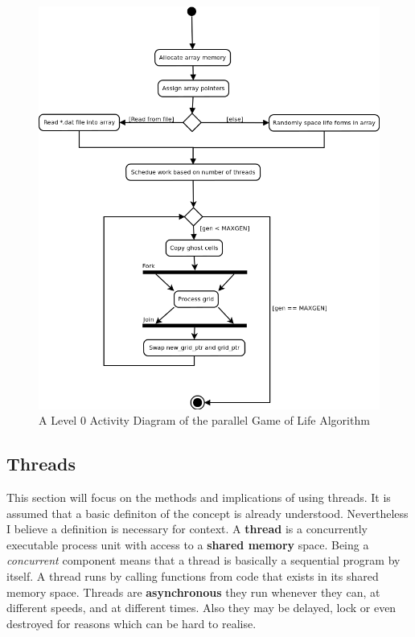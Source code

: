 \documentclass[11pt]{article} %
\begin{document}
\begin{figure}[h]
\caption{A Level 0 Activity Diagram of the parallel Game of Life Algorithm}
\centering
\includegraphics[scale=0.5]{parallel0.png}
\end{figure}
\subsection{Threads}
This section will focus on the methods and implications of using threads. It is assumed that a basic definiton of the concept is already understood. Nevertheless I believe a definition is necessary for context. A {\bf thread} is a concurrently executable process unit with access to a {\bf shared memory} space. Being a {\it concurrent} component means that a thread is basically a sequential program by itself. A thread runs by calling functions from code that exists in its shared memory space. Threads are {\bf asynchronous} they run whenever they can, at different speeds, and at different times. Also they may be delayed, lock or even destroyed for reasons which can be hard to realise. \cite[p70]{ref13} 
\end{document}
